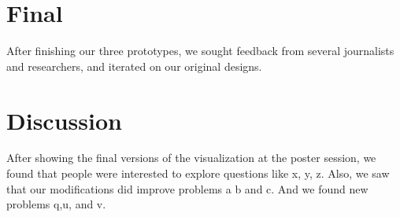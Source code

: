 \section{Final}
After finishing our three prototypes, we sought feedback from several journalists and researchers, and iterated on our original designs. 




\section{Discussion}
After showing the final versions of the visualization at the poster session, we found that people were interested to explore questions like x, y, z.  Also, we saw that our modifications did improve problems a b and c.  And we found new problems q,u, and v.